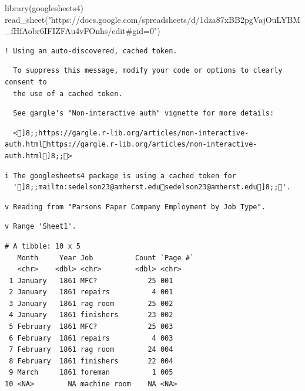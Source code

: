 \documentclass[
  letterpaper,
  DIV=11,
  numbers=noendperiod]{scrartcl}
\newenvironment{Shaded}{\begin{snugshade}}{\end{snugshade}}
\newcommand{\FunctionTok}[1]{\textcolor[rgb]{0.28,0.35,0.67}{#1}}
\newcommand{\NormalTok}[1]{\textcolor[rgb]{0.00,0.23,0.31}{#1}}
\newcommand{\StringTok}[1]{\textcolor[rgb]{0.13,0.47,0.30}{#1}}
\begin{document}
\begin{Shaded}
\begin{Highlighting}[]
\FunctionTok{library}\NormalTok{(googlesheets4)}
\FunctionTok{read\_sheet}\NormalTok{(}\StringTok{"https://docs.google.com/spreadsheets/d/1dza87xBB2pgVajOuLYBM\_fHfAobr6IFIZFAu4vFOnhs/edit\#gid=0"}\NormalTok{)}
\end{Highlighting}
\end{Shaded}

\begin{verbatim}
! Using an auto-discovered, cached token.
\end{verbatim}

\begin{verbatim}
  To suppress this message, modify your code or options to clearly consent to
  the use of a cached token.
\end{verbatim}

\begin{verbatim}
  See gargle's "Non-interactive auth" vignette for more details:
\end{verbatim}

\begin{verbatim}
  <]8;;https://gargle.r-lib.org/articles/non-interactive-auth.htmlhttps://gargle.r-lib.org/articles/non-interactive-auth.html]8;;>
\end{verbatim}

\begin{verbatim}
i The googlesheets4 package is using a cached token for
  ']8;;mailto:sedelson23@amherst.edusedelson23@amherst.edu]8;;'.
\end{verbatim}

\begin{verbatim}
v Reading from "Parsons Paper Company Employment by Job Type".
\end{verbatim}

\begin{verbatim}
v Range 'Sheet1'.
\end{verbatim}

\begin{verbatim}
# A tibble: 10 x 5
   Month     Year Job          Count `Page #`
   <chr>    <dbl> <chr>        <dbl> <chr>   
 1 January   1861 MFC?            25 001     
 2 January   1861 repairs          4 001     
 3 January   1861 rag room        25 002     
 4 January   1861 finishers       23 002     
 5 February  1861 MFC?            25 003     
 6 February  1861 repairs          4 003     
 7 February  1861 rag room        24 004     
 8 February  1861 finishers       22 004     
 9 March     1861 foreman          1 005     
10 <NA>        NA machine room    NA <NA>    
\end{verbatim}
\end{document}

